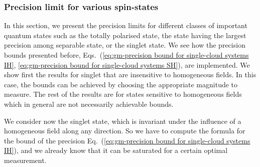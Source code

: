 
\subsubsection{Precision limit for various spin-states}

In this section, we present the precision limits for different classes of
important quantum states such as the totally polarised state,
the state having the largest precision among separable state,
or the singlet state.
We see how the precision bounds presented before, Eqs.~(\ref{eq:gm-precision
bound for single-cloud systems IH}, \ref{eq:gm-precision bound for single-cloud
systems SH}), are implemented.
We show first the results for singlet that are insensitive to homogeneous
fields.
In this case, the bounds can be achieved by choosing
the appropriate magnitude to measure.
The rest of the results are for states sensitive to homogeneous
fields which in general are not necessarily achievable bounds.


We consider now the singlet state, which is invariant under the influence
of a homogeneous field along any direction.
So we have to compute the formula for the bound
of the precision Eq.~(\ref{eq:gm-precision bound for single-cloud systems IH}),
and we already know that it can be saturated for a
certain optimal measurement.


